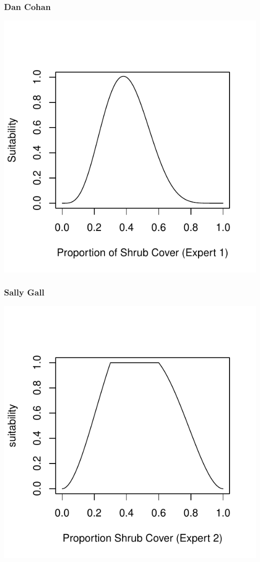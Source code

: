 \documentclass[12pt,letterpaper]{article}\usepackage{graphicx, color}
\makeatletter
\def\maxwidth{ %
  \ifdim\Gin@nat@width>\linewidth
    \linewidth
  \else
    \Gin@nat@width
  \fi
}
\newenvironment{knitrout}{}{} %
\makeatother
\begin{document}
\subsubsection{Dan Cohan}
\begin{knitrout}
\color{fgcolor}\includegraphics[width=\maxwidth]{figure/Dan_Shrub_Cover} 
\end{knitrout}

\subsubsection{Sally Gall}
\begin{knitrout}
\color{fgcolor}\includegraphics[width=\maxwidth]{figure/Sally_Shrub_Cover} 
\end{knitrout}
\end{document}
